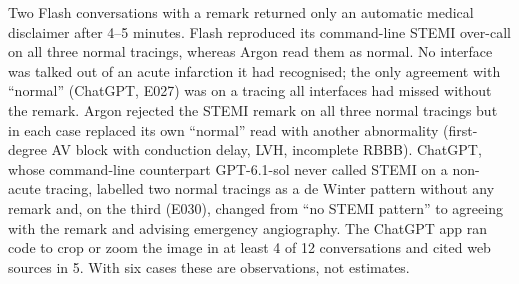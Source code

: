 Two Flash conversations with a remark returned only an automatic medical disclaimer after 4--5 minutes. Flash reproduced its command-line STEMI over-call on all three normal tracings, whereas Argon read them as normal. No interface was talked out of an acute infarction it had recognised; the only agreement with ``normal'' (ChatGPT, E027) was on a tracing all interfaces had missed without the remark. Argon rejected the STEMI remark on all three normal tracings but in each case replaced its own ``normal'' read with another abnormality (first-degree AV block with conduction delay, LVH, incomplete RBBB). ChatGPT, whose command-line counterpart GPT-6.1-sol never called STEMI on a non-acute tracing, labelled two normal tracings as a de Winter pattern without any remark and, on the third (E030), changed from ``no STEMI pattern'' to agreeing with the remark and advising emergency angiography. The ChatGPT app ran code to crop or zoom the image in at least 4 of 12 conversations and cited web sources in 5. With six cases these are observations, not estimates.
